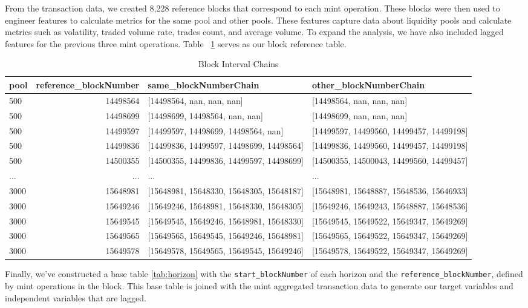 \documentclass{article}
\begin{document}
From the transaction data, we created 8,228 reference blocks that correspond to each mint operation. These blocks were then used to engineer features to calculate metrics for the same pool and other pools. These features capture data about liquidity pools and calculate metrics such as volatility, traded volume rate, trades count, and average volume. To expand the analysis, we have also included lagged features for the previous three mint operations. Table ~\ref{table:chains} serves as our block reference table.
\begin{table}[htbp]
  \centering
  \small
  \begin{tabularx}{\linewidth}{|X|r|l|l|}
    \hline
    \textbf{pool} & \textbf{reference\_blockNumber} & \textbf{same\_blockNumberChain} & \textbf{other\_blockNumberChain} \\
    \hline
    500 & 14498564 & [14498564, nan, nan, nan] & [14498564, nan, nan, nan] \\
    500 & 14498699 & [14498699, 14498564, nan, nan] & [14498699, nan, nan, nan] \\
    500 & 14499597 & [14499597, 14498699, 14498564, nan] & [14499597, 14499560, 14499457, 14499198] \\
    500 & 14499836 & [14499836, 14499597, 14498699, 14498564] & [14499836, 14499560, 14499457, 14499198] \\
    500 & 14500355 & [14500355, 14499836, 14499597, 14498699] & [14500355, 14500043, 14499560, 14499457] \\
    ... & ... & ... & ... \\
    3000 & 15648981 & [15648981, 15648330, 15648305, 15648187] & [15648981, 15648887, 15648536, 15646933] \\
    3000 & 15649246 & [15649246, 15648981, 15648330, 15648305] & [15649246, 15649243, 15648887, 15648536] \\
    3000 & 15649545 & [15649545, 15649246, 15648981, 15648330] & [15649545, 15649522, 15649347, 15649269] \\
    3000 & 15649565 & [15649565, 15649545, 15649246, 15648981] & [15649565, 15649522, 15649347, 15649269] \\
    3000 & 15649578 & [15649578, 15649565, 15649545, 15649246] & [15649578, 15649522, 15649347, 15649269] \\
    \hline
  \end{tabularx}
  \caption{Block Interval Chains}
  \label{table:chains}
\end{table}

Finally, we've constructed a base table \ref{tab:horizon} with the \texttt{start\_blockNumber} of each horizon and the \texttt{reference\_blockNumber}, defined by mint operations in the block. This base table is joined with the mint aggregated transaction data to generate our target variables and independent variables that are lagged.
\end{document}
